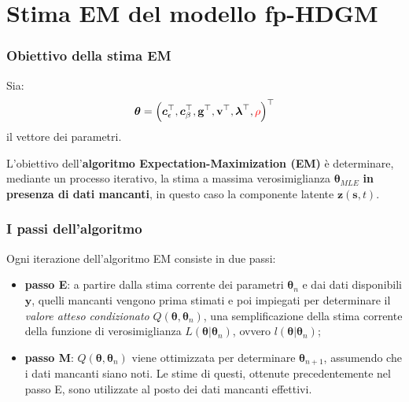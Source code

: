 \section[Stima EM del modello fp-HDGM]{Stima EM del modello fp-HDGM}

\begin{frame}
	\frametitle{Obiettivo della stima EM}
	\justifying
	
	Sia:
	\begin{equation*}
		\boldsymbol{\theta} = \left(\boldsymbol{c}_\epsilon^\top, \boldsymbol{c}_\beta^\top, \mathbf{g}^\top, \mathbf{v}^\top, \boldsymbol{\lambda}^\top, \textcolor{red}{\rho}\right)^\top
	\end{equation*}
	il vettore dei parametri. 
	\newline \par L'obiettivo dell'\textbf{algoritmo Expectation-Maximization (EM)} è determinare, mediante un processo iterativo, la stima a massima verosimiglianza $\boldsymbol{\theta}_{MLE}$ \textbf{in presenza di dati mancanti}, in questo caso la componente latente $\mathbf{z}(\mathbf{s}, t)$.
\end{frame}

\begin{frame}
	\frametitle{I passi dell'algoritmo}
	\justifying
	
	Ogni iterazione dell'algoritmo EM consiste in due passi:
	\begin{itemize}
		\justifying
		\item \textbf{passo E}: a partire dalla stima corrente dei parametri $\boldsymbol{\theta}_n$ e dai dati disponibili $\mathbf{y}$, quelli mancanti vengono prima stimati e poi impiegati per determinare il \textit{valore atteso condizionato} $Q(\boldsymbol{\theta},\boldsymbol{\theta}_n)$, una semplificazione della stima corrente della funzione di verosimiglianza $L(\boldsymbol{\theta}|\boldsymbol{\theta}_n)$, ovvero $l(\boldsymbol{\theta}|\boldsymbol{\theta}_n)$;
		\item \textbf{passo M}: $Q(\boldsymbol{\theta},\boldsymbol{\theta}_n)$ viene ottimizzata per determinare $\boldsymbol{\theta}_{n+1}$, assumendo che i dati mancanti siano noti. Le stime di questi, ottenute precedentemente nel passo E, sono utilizzate al posto dei dati mancanti effettivi.
	\end{itemize}
\end{frame}

